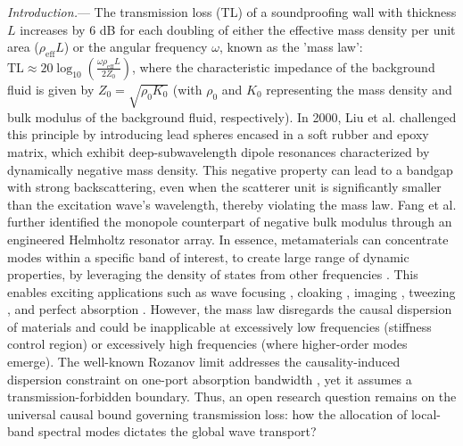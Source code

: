 \documentclass[final,5p,times,twocolumn]{elsarticle}
\begin{document}
\textit{Introduction.}— The transmission loss (TL) of a soundproofing wall with thickness \( L \) increases by 6 dB for each doubling of either the effective mass density per unit area (\( \rho_{\mathrm{eff}}L \)) or the angular frequency \( \omega \), known as the 'mass law': \( \mathrm{TL} \approx 20 \log_{10} \left( \frac{\omega \rho_{\text{eff}} L}{2 Z_0} \right) \), where the characteristic impedance of the background fluid is given by \( Z_0 = \sqrt{\rho_0 K_0} \) (with \( \rho_0 \) and \( K_0 \) representing the mass density and bulk modulus of the background fluid, respectively). In 2000, Liu et al. \cite{liu2000locally} challenged this principle by introducing lead spheres encased in a soft rubber and epoxy matrix, which exhibit deep-subwavelength dipole resonances characterized by dynamically negative mass density. This negative property \cite{lee2016origin} can lead to a bandgap with strong backscattering, even when the scatterer unit is significantly smaller than the excitation wave's wavelength, thereby violating the mass law. Fang et al. \cite{fang2006ultrasonic} further identified the monopole counterpart of negative bulk modulus through an engineered Helmholtz resonator array. In essence, metamaterials can concentrate modes within a specific band of interest, to create large range of dynamic properties, by leveraging the density of states from other frequencies \cite{monticone2013cloaked, wang2025seven,landi2018acoustic}. This enables exciting applications such as wave focusing \cite{oh2023engineering}, cloaking \cite{xu2021transformation}, imaging \cite{zhu2011holey}, tweezing \cite{xu2024acoustofluidic}, and perfect absorption \cite{qu2022microwave,yang2025acoustic}. However, the mass law disregards the causal dispersion of materials and could be inapplicable at excessively low frequencies (stiffness control region) or excessively high frequencies (where higher-order modes emerge). The well-known Rozanov limit addresses the causality-induced dispersion constraint on one-port absorption bandwidth \cite{rozanov2000ultimate, acher2009fundamental, yang2017sound}, yet it assumes a transmission-forbidden boundary. Thus, an open research question remains on the universal causal bound governing transmission loss: how the allocation of local-band spectral modes dictates the global wave transport?
\end{document}
